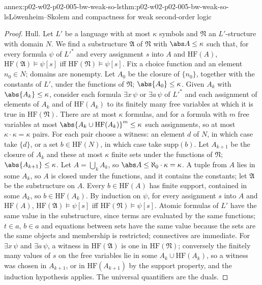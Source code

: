 \begin{annexitem}{annex:p02-w02-p02-005-bw-weak-so-ls}{thm:p02-w02-p02-005-bw-weak-so-ls}{L\"owenheim--Skolem and compactness for weak second-order logic}
\begin{proof}
Hull.  Let \(L'\) be a language with at most \(\kappa\) symbols and
\(\mathfrak N\) an \(L'\)-structure with domain \(N\).  We find a
substructure \(\mathfrak A\) of \(\mathfrak N\) with \(\abs A\leq\kappa\)
such that, for every formula \(\psi\) of \(L'^{*}\) and every assignment
\(s\) into \(A\) and \(\mathrm{HF}(A)\),
\(\mathrm{HF}(\mathfrak A)\models\psi[s]\) iff
\(\mathrm{HF}(\mathfrak N)\models\psi[s]\).  Fix a choice function and an
element \(n_0\in N\); domains are nonempty.  Let \(A_0\) be the closure of
\(\{n_0\}\), together with the constants of \(L'\), under the functions of
\(\mathfrak N\); \(\abs{A_0}\leq\kappa\).  Given \(A_k\) with
\(\abs{A_k}\leq\kappa\), consider each formula \(\exists x\,\psi\) or
\(\exists a\,\psi\) of \(L'^{*}\) and each assignment of elements of
\(A_k\) and of \(\mathrm{HF}(A_k)\) to its finitely many free variables at
which it is true in \(\mathrm{HF}(\mathfrak N)\).  There are at most
\(\kappa\) formulas, and for a formula with \(m\) free variables at most
\(\abs{A_k\cup\mathrm{HF}(A_k)}^m\leq\kappa\) such assignments, so at most
\(\kappa\cdot\kappa=\kappa\) pairs.  For each pair choose a witness: an
element \(d\) of \(N\), in which case take \(\{d\}\), or a set
\(b\in\mathrm{HF}(N)\), in which case take \(\mathrm{supp}(b)\).  Let
\(A_{k+1}\) be the closure of \(A_k\) and these at most \(\kappa\) finite
sets under the functions of \(\mathfrak N\); \(\abs{A_{k+1}}\leq\kappa\).
Let \(A=\bigcup_kA_k\), so \(\abs A\leq\aleph_0\cdot\kappa=\kappa\).  A
tuple from \(A\) lies in some \(A_k\), so \(A\) is closed under the
functions, and it contains the constants; let \(\mathfrak A\) be the
substructure on \(A\).  Every \(b\in\mathrm{HF}(A)\) has finite support,
contained in some \(A_k\), so \(b\in\mathrm{HF}(A_k)\).  By induction on
\(\psi\), for every assignment \(s\) into \(A\) and \(\mathrm{HF}(A)\),
\(\mathrm{HF}(\mathfrak A)\models\psi[s]\) iff
\(\mathrm{HF}(\mathfrak N)\models\psi[s]\).  Atomic formulas of \(L'\) have
the same value in the substructure, since terms are evaluated by the same
functions; \(t\in a\), \(b\in a\) and equations between sets have the
same value because the sets are the same objects and membership is
restricted; connectives are immediate.  For \(\exists x\,\psi\) and
\(\exists a\,\psi\), a witness in \(\mathrm{HF}(\mathfrak A)\) is one in
\(\mathrm{HF}(\mathfrak N)\); conversely the finitely many values of
\(s\) on the free variables lie in some \(A_k\cup\mathrm{HF}(A_k)\), so a
witness was chosen in \(A_{k+1}\), or in \(\mathrm{HF}(A_{k+1})\) by the
support property, and the induction hypothesis applies.  The universal
quantifiers are the duals.


\end{proof}
\end{annexitem}
